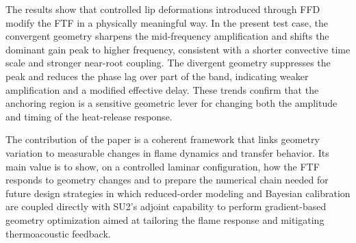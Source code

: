 \documentclass{iopconfser}
\begin{document}
The results show that controlled lip deformations introduced through FFD modify the FTF in a physically meaningful way. In the present test case, the convergent geometry sharpens the mid-frequency amplification and shifts the dominant gain peak to higher frequency, consistent with a shorter convective time scale and stronger near-root coupling. The divergent geometry suppresses the peak and reduces the phase lag over part of the band, indicating weaker amplification and a modified effective delay. These trends confirm that the anchoring region is a sensitive geometric lever for changing both the amplitude and timing of the heat-release response.

The contribution of the paper is a coherent framework that links geometry variation to measurable changes in flame dynamics and transfer behavior. Its main value is to show, on a controlled laminar configuration, how the FTF responds to geometry changes and to prepare the numerical chain needed for future design strategies in which reduced-order modeling and Bayesian calibration are coupled directly with SU2's adjoint capability to perform gradient-based geometry optimization aimed at tailoring the flame response and mitigating thermoacoustic feedback.
\end{document}
